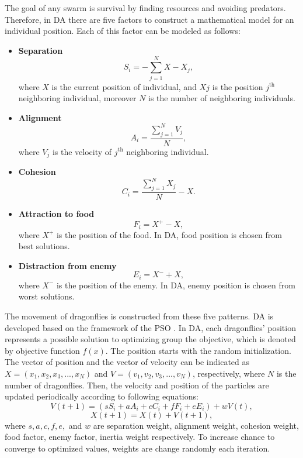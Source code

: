 The goal of any swarm is survival by finding resources and avoiding predators. Therefore, in DA there are five factors to construct a mathematical model for an individual position. Each of this factor can be modeled as follows:

\begin{itemize}
	\item \textbf{Separation}\\
	\begin{equation}
	S_i = - \sum_{j=1}^{N} X - X_j,
	\end{equation}
	where $X$ is the current position of individual, and $Xj$ is the position $j^{\text{th}}$ neighboring individual, moreover $N$ is the number of neighboring individuals.
	\item \textbf{Alignment}\\
	\begin{equation}
	A_i = \frac{\sum_{j=1}^{N} V_j}{N},
	\end{equation}
	where $V_j$ is the velocity of $j^{\text{th}}$ neighboring individual.
	\item \textbf{Cohesion}\\
	\begin{equation}
	C_i = \frac{\sum_{j=1}^{N} X_j}{N}-X.
	\end{equation}
	\item \textbf{Attraction to food}\\
	\begin{equation}
	F_i = X^+ -X,
	\end{equation}
	where $X^+$ is the position of the food. In DA, food position is chosen from best solutions.
	\item \textbf{Distraction from enemy}
	\begin{equation}
	E_i = X^- + X,
	\end{equation}
	where $X^-$ is the position of the enemy. In DA, enemy position is chosen from worst solutions.
\end{itemize} 

The movement of dragonflies is constructed from these five patterns. DA is developed based on the framework of the PSO \cite{7435672, Rao2017}. In DA, each dragonflies' position represents a possible solution to optimizing group the objective, which is denoted by objective function $f(x)$. The position starts with the random initialization. The vector of position and the vector of velocity can be indicated as $X = (x_{1}, x_{2}, x_{3}, ..., x_{N})$ and $V = (v_{1}, v_{2}, v_{3}, ..., v_{N})$, respectively, where $N$ is the number of dragonflies. Then, the velocity and position of the particles are updated periodically according to following equations:
\begin{equation}
\label{eq1}
V(t+1) = (sS_i + aA_i + cC_i + fF_i + eE_i) + wV(t),
\end{equation}
\begin{equation}
\label{eq2}
X(t+1) = X(t) + V(t+1),
\end{equation}
where $s, a, c, f, e,$ and $w$ are separation weight, alignment weight, cohesion weight, food factor, enemy factor, inertia weight respectively. To increase chance to converge to optimized values, weights are change randomly each iteration.

